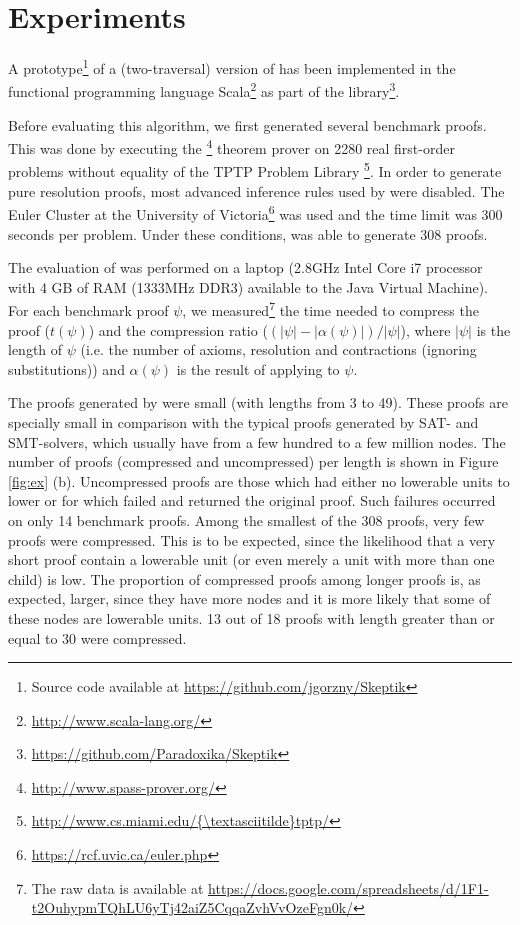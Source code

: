 
\section{Experiments} \label{sec:exp}

A prototype\footnote{Source code available at \url{https://github.com/jgorzny/Skeptik}} of a (two-traversal) version of {\SFOLowerUnits} has been implemented in the functional programming language Scala\footnote{\url{http://www.scala-lang.org/}} as part of the \skeptik
 library\footnote{\url{https://github.com/Paradoxika/Skeptik}}. 

Before evaluating this algorithm, we first generated several benchmark proofs. This was done by executing the {\SPASS}\footnote{\url{http://www.spass-prover.org/}} theorem prover on 2280 real first-order problems without equality of the TPTP Problem Library \footnote{\url{http://www.cs.miami.edu/{\textasciitilde}tptp/}}. In order to generate pure resolution proofs, most advanced inference rules used by {\SPASS}  were disabled. The Euler Cluster at the University of Victoria\footnote{\url{https://rcf.uvic.ca/euler.php}} was used and the time limit was 300 seconds per problem. Under these conditions, {\SPASS} was able to generate 308 proofs. 

The evaluation of {\SFOLowerUnits} was performed on a laptop (2.8GHz Intel Core i7 processor with 4 GB of RAM (1333MHz DDR3) available to the Java Virtual Machine). For each benchmark proof $\psi$, we measured\footnote{The raw data is available at  \url{https://docs.google.com/spreadsheets/d/1F1-t2OuhypmTQhLU6yTj42aiZ5CqqaZvhVvOzeFgn0k/}} the time needed to compress the proof ($t(\psi)$) and the compression ratio ($(|\psi|-|\alpha(\psi)|)/|\psi|$), where $|\psi|$ is the length of $\psi$ (i.e. the number of axioms, resolution and contractions (ignoring substitutions)) and $\alpha(\psi)$ is the result of applying {\SFOLowerUnits} to $\psi$.

The proofs generated by {\SPASS} were small (with lengths from 3 to 49). These proofs are specially small in comparison with the typical proofs generated by SAT- and SMT-solvers, which usually have from a few hundred to a few million nodes. The number of proofs (compressed and uncompressed) per length is shown in Figure \ref{fig:ex} (b). Uncompressed proofs are those which had either no lowerable units to lower or for which \SFOLowerUnits failed and returned the original proof. Such failures occurred on only 14 benchmark proofs. Among the smallest of the 308 proofs, very few proofs were compressed. This is to be expected, since the likelihood that a very short proof contain a lowerable unit (or even merely a unit with more than one child) is low. The proportion of compressed proofs among longer proofs is, as expected, larger, since they have more nodes and it is more likely that some of these nodes are lowerable units. 13 out of 18 proofs with length greater than or equal to 30 were compressed. 

